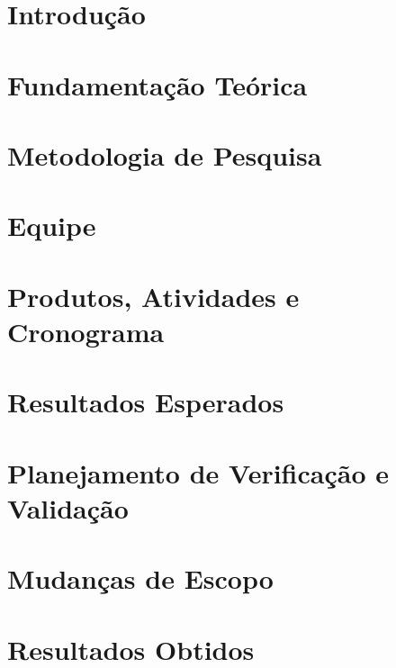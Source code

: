 \section{Introdução} %
\label{sec:introdu_o}
 

\section{Fundamentação Teórica} %
\label{sec:fundamentacao}
 

\section{Metodologia de Pesquisa} %
\label{sec:metodologia}
 

\section{Equipe} %
\label{sec:equipe}
 

\section{Produtos, Atividades e Cronograma} %
\label{sec:produtos}
 

\section{Resultados Esperados} %
\label{sec:resultados_esperados}
 

\section{Planejamento de Verificação e Validação} %
\label{sec:planejamento}
 

\section{Mudanças de Escopo} %
\label{sec:mudan_as_de_escopo}


\section{Resultados Obtidos} %
\label{sec:resultados_obtidos}

